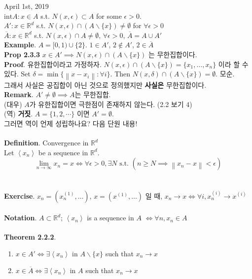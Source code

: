 \documentclass[12pt]{report}
\newcommand{\bb}[1]{\mathbb{#1}}
\newcommand{\norm}[1]{\left\lVert#1\right\rVert}
\renewcommand{\span}[1]{\left\langle #1 \right\rangle}
\newcommand{\inte}{\mathrm{int}}
\begin{document}
April 1st, 2019\\
$ \inte A : x\in A$ s.t. $N(x, \epsilon) \subset A$ for some $\epsilon > 0$.\\
$A': x\in \bb{R}^d$ s.t. $N(x, \epsilon) \cap (A\backslash\{x\})\neq \emptyset$ for $\forall \epsilon >0$\\
$\overline{A}: x\in \bb{R}^d$ s.t. $N(x, \epsilon) \cap A\neq\emptyset$, $\forall \epsilon>0$, $\overline{A} = A\cup A'$\\
\textbf{Example}. $A=[0, 1)\cup \{2\}$. $ 1\in A' $, $ 2\notin A' $, $ 2\in \overline{A} $\\
\textbf{Prop 2.3.3} $ x\in A' \implies N(x, \epsilon)\cap (A\backslash \{x\})$ 는 무한집합이다.\\
\textbf{Proof}. 유한집합이라고 가정하자. $N(x, \epsilon) \cap (A\backslash \{x\}) = \{x_1, \dots, x_n\}$ 이라 할 수 있다.
Set $\delta = \min\{\norm{x-x_i}: \forall i\}$. Then $ N(x, \delta) \cap (A\backslash \{x\})=\emptyset $. 모순.\\
그래서 사실은 공집합이 아닌 것으로 정의했지만 \textbf{사실은} 무한집합이다.\\
\textbf{Remark}. $A'\neq\emptyset\implies A$는 무한집합.\\
(대우) $A$가 유한집합이면 극한점이 존재하지 않는다. (2.2 보기 4)\\
(역) \textbf{거짓}. $A = \{1, 2, \cdots\}$ 이면 $A'=\emptyset$.\\
그러면 역이 언제 성립하나요? 다음 단원 내용!\\
\\
\textbf{Definition}. Convergence in $\bb{R}^d$\\
Let $\span{x_n}$ be a sequence in $\bb{R}^d$. $$\lim_{n\rightarrow \infty} x_n= x \iff \forall \epsilon>0, \exists N \text{ s.t. } \left (n\geq N \implies \norm{x_n-x}<\epsilon\right )$$\\
\\
\textbf{Exercise}. $x_n = (x_n^{(1)}, \dots)$, $x = (x^{(1)}, \dots)$ 일 때, $x_n\rightarrow x \iff \forall i, x_n^{(i)} \rightarrow x^{(i)} $\\
\\
\textbf{Notation}. $A\subset \bb{R}^d$; $\span{x_n}$ is a sequence in $A$ $\iff \forall n, x_n\in A $\\
\\
\textbf{Theorem 2.2.2}.
\begin{enumerate}
	\item $x\in A' \iff \exists \span{x_n}$ in $A\backslash \{x\}$ such that $x_n\rightarrow x$
	\item $x\in \overline{A} \iff \exists \span{x_n}$ in $A$ such that $x_n\rightarrow x$ 
\end{enumerate}
\end{document}
